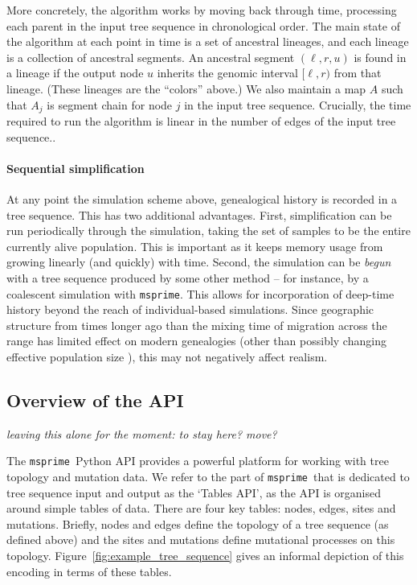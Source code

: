 \documentclass{article}
\newcommand{\msprime}{\texttt{msprime}}
\newcommand{\plr}[1]{{\em \color{blue} #1}}
\begin{document}
More concretely,
the algorithm works by moving back through time,
processing each parent in the input tree sequence in chronological order.
The main state of the algorithm at each point in time is a set of ancestral lineages,
and each lineage is a collection of ancestral segments.
An ancestral segment $(\ell, r, u)$ is found in a lineage
if the output node $u$ inherits the genomic interval $[\ell, r)$ from that lineage.
(These lineages are the ``colors'' above.)
We also maintain a map $A$ such that $A_j$ is segment chain for node $j$ in
the input tree sequence.
Crucially, the time required to run the algorithm is linear in the number of edges of the input tree sequence..

\paragraph{Sequential simplification}
At any point the simulation scheme above, genealogical history is recorded
in a tree sequence. This has two additional advantages. First, simplification
can be run periodically through the simulation, taking the set of samples to be
the entire currently alive population. This is important as it keeps memory
usage from growing linearly (and quickly) with time. Second, the simulation can
be \emph{begun} with a tree sequence produced by some other method -- for
instance, by a coalescent simulation with \msprime. This allows for
incorporation of deep-time history beyond the reach of individual-based
simulations. Since geographic structure from times longer ago than the mixing
time of migration across the range has limited effect on modern genealogies
\citep{wilkins_separation} (other than possibly changing effective population
size \citet{durretspatial}), this may not negatively affect realism.


\subsection*{Overview of the API}

\plr{leaving this alone for the moment: to stay here? move?}

The \msprime\ Python API provides a powerful platform for working with
tree topology and mutation data. We refer to the part of \msprime\
that is dedicated to tree sequence input and output as the `Tables API',
as the API is organised around simple tables of data. There are four key
tables: nodes, edges, sites and mutations. Briefly, nodes and edges define
the topology of a tree sequence (as defined above) and the sites and mutations
define mutational processes on this topology.
Figure~\ref{fig:example_tree_sequence} gives an informal depiction of this
encoding in terms of these tables.
\end{document}

